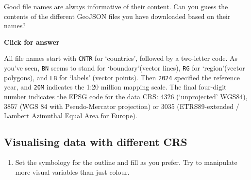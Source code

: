 \documentclass[
  letterpaper,
  DIV=11,
  numbers=noendperiod]{scrreprt}
\providecommand{\tightlist}{%
  \setlength{\itemsep}{0pt}\setlength{\parskip}{0pt}}\usepackage{longtable,booktabs,array}
\begin{document}
\begin{tcolorbox}[enhanced jigsaw, breakable, toptitle=1mm, colback=white, left=2mm, leftrule=.75mm, titlerule=0mm, colframe=quarto-callout-important-color-frame, opacityback=0, title=\textcolor{quarto-callout-important-color}{\faExclamation}\hspace{0.5em}{Stop and Think}, toprule=.15mm, opacitybacktitle=0.6, bottomtitle=1mm, colbacktitle=quarto-callout-important-color!10!white, bottomrule=.15mm, coltitle=black, rightrule=.15mm, arc=.35mm]

Good file names are always informative of their content. Can you guess
the contents of the different GeoJSON files you have downloaded based on
their names?

\end{tcolorbox}

\begin{tcolorbox}[enhanced jigsaw, leftrule=.75mm, colframe=quarto-callout-important-color-frame, breakable, toprule=.15mm, bottomrule=.15mm, arc=.35mm, rightrule=.15mm, opacityback=0, colback=white, left=2mm]

\vspace{-3mm}\textbf{Click for answer}\vspace{3mm}

All file names start with \texttt{CNTR} for `countries', followed by a
two-letter code. As you've seen, \texttt{BN} seems to stand for
`boundary'(vector lines), \texttt{RG} for `region'(vector polygons), and
\texttt{LB} for `labels' (vector points). Then \texttt{2024} specified
the reference year, and \texttt{20M} indicates the 1:20 million mapping
scale. The final four-digit number indicates the EPSG code for the data
CRS: 4326 (`unprojected' WGS84), 3857 (WGS 84 with Pseudo-Mercator
projection) or 3035 (ETRS89-extended / Lambert Azimuthal Equal Area for
Europe).

\end{tcolorbox}

\subsection{Visualising data with different
CRS}\label{visualising-data-with-different-crs}

\begin{enumerate}
\def\labelenumi{(\arabic{enumi})}
\setcounter{enumi}{52}
\tightlist
\item
  Set the symbology for the outline and fill as you prefer. Try to
  manipulate more visual variables than just colour.
\end{enumerate}
\end{document}

